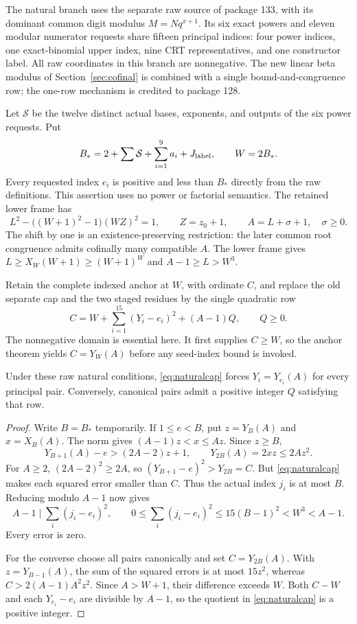 The natural branch uses the separate raw source of package 133, with its
dominant common digit modulus $M=Nq^{x+1}$. Its six exact powers and eleven modular numerator requests share fifteen
principal indices: four power indices, one exact-binomial upper index,
nine CRT representatives, and one constructor label. All raw coordinates in this
branch are nonnegative. The new linear beta modulus of
Section~\ref{sec:cofinal} is combined with a single bound-and-congruence
row; the one-row mechanism is credited to package 128.

Let $\mathcal S$ be the twelve distinct actual bases, exponents, and outputs
of the six power requests. Put
\[
 B_*=2+\sum\mathcal S+\sum_{i=1}^9a_i+J_{\rm label},
 \qquad W=2B_*.
\]
Every requested index $e_i$ is positive and less than $B_*$ directly from
the raw definitions. This assertion uses no power or factorial semantics.
The retained lower frame has
\[
 L^2-\bigl((W+1)^2-1\bigr)(WZ)^2=1,\qquad Z=z_0+1,
 \qquad A=L+\sigma+1,\quad \sigma\ge0.
\]
The shift by one is an existence-preserving restriction: the later common
root congruence admits cofinally many compatible $A$. The lower frame
gives $L\ge X_W(W+1)\ge(W+1)^W$ and $A-1\ge L>W^3$.

Retain the complete indexed anchor at $W$, with ordinate $C$, and replace
the old separate cap and the two staged residues by the single quadratic
row
\begin{equation}\label{eq:naturalcap}
 \boxed{C=W+\sum_{i=1}^{15}(Y_i-e_i)^2+(A-1)Q,\qquad Q\ge0.}
\end{equation}
The nonnegative domain is essential here. It first supplies $C\ge W$,
so the anchor theorem yields $C=Y_W(A)$ before any seed-index bound is
invoked.

\begin{lemma}
Under these raw natural conditions, \eqref{eq:naturalcap} forces
$Y_i=Y_{e_i}(A)$ for every principal pair. Conversely, canonical pairs
admit a positive integer $Q$ satisfying that row.
\end{lemma}
\begin{proof}
Write $B=B_*$ temporarily. If $1\le e<B$, put $z=Y_B(A)$ and
$x=X_B(A)$. The norm gives $(A-1)z<x\le Az$. Since $z\ge B$,
\[
 Y_{B+1}(A)-e>(2A-2)z+1,\qquad Y_{2B}(A)=2xz\le2Az^2.
\]
For $A\ge2$, $(2A-2)^2\ge2A$, so
$(Y_{B+1}-e)^2>Y_{2B}=C$. But \eqref{eq:naturalcap} makes each squared
error smaller than $C$. Thus the actual index $j_i$ is at most $B$.
Reducing modulo $A-1$ now gives
\[
 A-1\mid\sum_i(j_i-e_i)^2,
 \qquad 0\le\sum_i(j_i-e_i)^2\le15(B-1)^2<W^3<A-1.
\]
Every error is zero.

For the converse choose all pairs canonically and set $C=Y_{2B}(A)$.
With $z=Y_{B-1}(A)$, the sum of the squared errors is at most $15z^2$,
whereas $C>2(A-1)A^2z^2$. Since $A>W+1$, their difference exceeds $W$.
Both $C-W$ and each $Y_{e_i}-e_i$ are divisible by $A-1$, so the
quotient in \eqref{eq:naturalcap} is a positive integer.
\end{proof}

